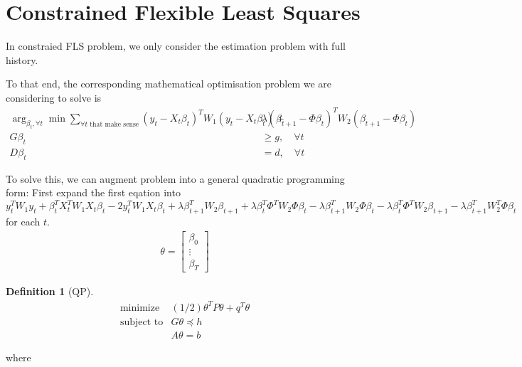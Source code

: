 \documentclass{article}
\theoremstyle{plain}
\theoremstyle{definition}
\newtheorem{defn}[thm]{Definition}
\theoremstyle{remark}
\begin{document}
\section{Constrained Flexible Least Squares}
In constraied FLS problem, we only consider the estimation problem with full history.

To that end, the corresponding mathematical optimisation problem we are considering to solve is
\begin{equation}
\begin{split}
\arg_{\beta_t,\forall t}\min\sum_{\forall t \text{ that make sense}} (y_t - X_t \beta_t)^T W_1 (y_t - X_t \beta_t) +& \lambda (\beta_{t+1} - \Phi \beta_t)^T W_2 (\beta_{t+1} - \Phi \beta_t)\\
G \beta_t & \geq g, \quad \forall t\\
D \beta_t & = d, \quad \forall t
\end{split}
\end{equation}

To solve this, we can augment problem into a general quadratic programming form:
First expand the first eqation into
\[
y_t^T W_1 y_t + \beta_t^T X_t^T W_1 X_t \beta_t - 2 y_t^T W_1 X_t \beta_t + 
\lambda \beta_{t+1}^T W_2 \beta_{t+1} + \lambda \beta_t^T \Phi^T W_2 \Phi \beta_t -  \lambda \beta_{t+1}^T W_2 \Phi \beta_t -  \lambda \beta_{t}^T \Phi^T W_2  \beta_{t+1} -  \lambda \beta_{t+1}^T W^T_2\Phi   \beta_{t} 
\]
for each $t$.
\begin{equation}
\begin{split}
\theta = \left[
\begin{array}{c}
\beta_{0}\\
\vdots\\
\beta_{T}
\end{array}
\right]
\end{split}
\end{equation}

\begin{defn}[QP]
\begin{eqnarray*}
\mbox{minimize} & (1/2) \theta^TP\theta + q^T \theta \\
\mbox{subject to} & G\theta \preceq h \\ & A\theta = b
\end{eqnarray*}
\end{defn}
where
\end{document}
